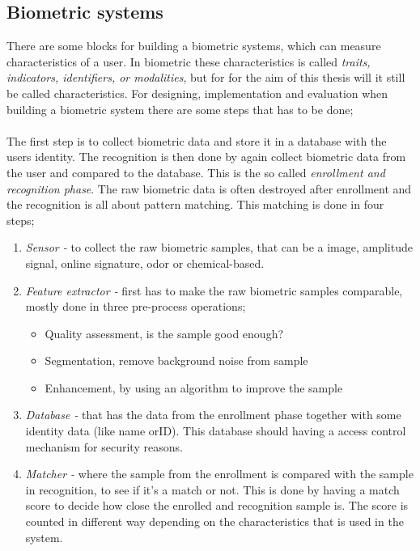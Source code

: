 \subsection{Biometric systems}
There are some blocks for building a biometric systems, which can measure characteristics of a user. In biometric these characteristics is called \textit{traits, indicators, identifiers, or modalities}, but for for the aim of this thesis will it still be called characteristics. For designing, implementation and evaluation when building a biometric system there are some steps that has to be done;\\
\\
The first step is to collect biometric data and store it in a database with the users identity. The recognition is then done by again collect biometric data from the user and compared to the database. This is the so called \textit{enrollment and recognition phase}. The raw biometric data is often destroyed after enrollment and the recognition is all about pattern matching. This matching is done in four steps;
\begin{enumerate}
	\item \textit{Sensor -} to collect the raw biometric samples, that can be a image, amplitude signal, online signature, odor or chemical-based.
	\item \textit{Feature extractor -} first has to make the raw biometric samples comparable, mostly done in three pre-process operations; 
	\begin{itemize}
    	\item Quality assessment, is the sample good enough?
		\item Segmentation, remove background noise from sample
		\item Enhancement, by using an algorithm to improve the sample 
    \end{itemize}
	\item \textit{Database -} that has the data from the enrollment phase together with some identity data (like name orID). This database should having a access control mechanism for security reasons.
	\item \textit{Matcher -} where the sample from the enrollment is compared with the sample in recognition, to see if it's a match or not. This is done by having a match score to decide how close the enrolled and recognition sample is. The score is counted in different way depending on the characteristics that is used in the system. 
\end{enumerate}
\cite[ch.~1]{introbio}

